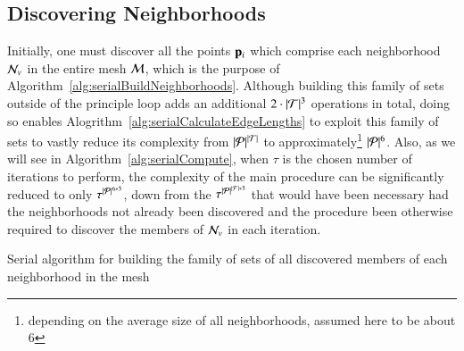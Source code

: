 \subsection{Discovering Neighborhoods}
\label{ch5sSIssDN}
Initially, one must discover all the points $\mathbf{p}_i$ which comprise each neighborhood $\mathcal{N}_v$ in the entire mesh $\mathcal{M}$, which is the purpose of Algorithm~\ref{alg:serialBuildNeighborhoods}. Although building this family of sets outside of the principle loop adds an additional $2\cdot |\mathcal{T}|^3$ operations in total, doing so enables Alogrithm~\ref{alg:serialCalculateEdgeLengths} to exploit this family of sets to vastly reduce its complexity from $|\mathcal{P}|^{|\mathcal{T}|}$ to approximately\footnote{depending on the average size of all neighborhoods, assumed here to be about 6} $|\mathcal{P}|^6$. Also, as we will see in Algorithm~\ref{alg:serialCompute}, when $\tau$ is the chosen number of iterations to perform, the complexity of the main procedure can be significantly reduced to only $\tau^{|\mathcal{P}|^{6*3}}$, down from the $\tau^{|\mathcal{P}|^{|\mathcal{F}|*3}}$ that would have been necessary had the neighborhoods not already been discovered and the procedure been otherwise required to discover the members of $\mathcal{N}_v$ in each iteration.%
%

\begin{algorithm}
	\DontPrintSemicolon


	\bigskip
	\FuncArgSty{($\bT$)}\;
\nl	{}
	\caption{Serial algorithm for building the family of sets of all discovered members of each neighborhood in the mesh}
\end{algorithm}%
%

